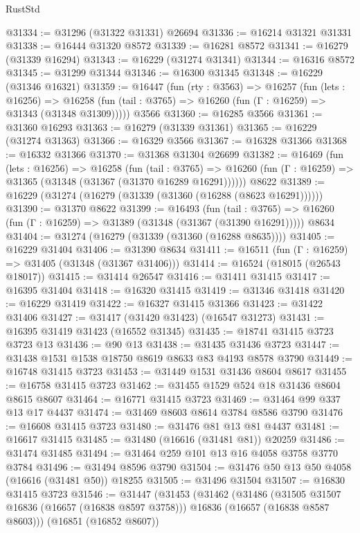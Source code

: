 \begin{lexlean}{RustStd}
\begin{coremodule}
@31334 := @31296 (@31322 @31331) @26694
@31336 := @16214 @31321 @31331
@31338 := @16444 @31320 @8572
@31339 := @16281 @8572
@31341 := @16279 (@31339 @16294)
@31343 := @16229 (@31274 @31341)
@31344 := @16316 @8572
@31345 := @31299 @31344
@31346 := @16300 @31345
@31348 := @16229 (@31346 @16321)
@31359 := @16447
    (fun (rty : @3563) =>
    @16257
      (fun (lets : @16256) =>
      @16258 (fun (tail : @3765) => @16260 (fun (Γ : @16259) => @31343 (@31348 @31309)))))
    @3566
@31360 := @16285 @3566
@31361 := @31360 @16293
@31363 := @16279 (@31339 @31361)
@31365 := @16229 (@31274 @31363)
@31366 := @16329 @3566
@31367 := @16328 @31366
@31368 := @16332 @31366
@31370 := @31368 @31304 @26699
@31382 := @16469
    (fun (lets : @16256) =>
    @16258
      (fun (tail : @3765) =>
      @16260 (fun (Γ : @16259) => @31365 (@31348 (@31367 (@31370 @16289 @16291))))))
    @8622
@31389 := @16229 (@31274 (@16279 (@31339 (@31360 (@16288 (@8623 @16291))))))
@31390 := @31370 @8622
@31399 := @16493
    (fun (tail : @3765) => @16260 (fun (Γ : @16259) => @31389 (@31348 (@31367 (@31390 @16291)))))
    @8634
@31404 := @31274 (@16279 (@31339 (@31360 (@16288 @8635))))
@31405 := @16229 @31404
@31406 := @31390 @8634
@31411 := @16511 (fun (Γ : @16259) => @31405 (@31348 (@31367 @31406)))
@31414 := @16524 (@18015 (@26543 @18017))
@31415 := @31414 @26547
@31416 := @31411 @31415
@31417 := @16395 @31404
@31418 := @16320 @31415
@31419 := @31346 @31418
@31420 := @16229 @31419
@31422 := @16327 @31415 @31366
@31423 := @31422 @31406
@31427 := @31417 (@31420 @31423) (@16547 @31273)
@31431 := @16395 @31419 @31423 (@16552 @31345)
@31435 := @18741 @31415 @3723 @3723 @13
@31436 := @90 @13
@31438 := @31435 @31436 @3723
@31447 := @31438 @1531 @1538 @18750 @8619 @8633 @83 @4193 @8578 @3790
@31449 := @16748 @31415 @3723
@31453 := @31449 @1531 @31436 @8604 @8617
@31455 := @16758 @31415 @3723
@31462 := @31455 @1529 @524 @18 @31436 @8604 @8615 @8607
@31464 := @16771 @31415 @3723
@31469 := @31464 @99 @337 @13 @17 @4437
@31474 := @31469 @8603 @8614 @3784 @8586 @3790
@31476 := @16608 @31415 @3723
@31480 := @31476 @81 @13 @81 @4437
@31481 := @16617 @31415
@31485 := @31480 (@16616 (@31481 @81)) @20259
@31486 := @31474 @31485
@31494 := @31464 @259 @101 @13 @16 @4058 @3758 @3770 @3784
@31496 := @31494 @8596 @3790
@31504 := @31476 @50 @13 @50 @4058 (@16616 (@31481 @50)) @18255
@31505 := @31496 @31504
@31507 := @16830 @31415 @3723
@31546 := @31447
    (@31453
      (@31462
        (@31486
          (@31505 @31507 @16836 (@16657 (@16838 @8597 @3758)))
          @16836
          (@16657 (@16838 @8587 @8603)))
        (@16851 (@16852 @8607))

\end{coremodule}
\end{lexlean}
